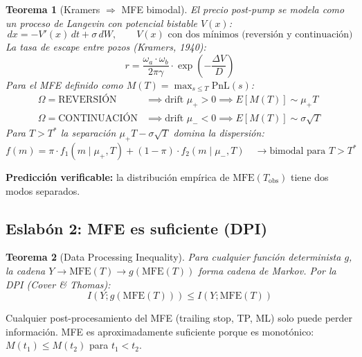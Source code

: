 \documentclass[11pt,a4paper]{article}
\newtheorem{theorem}{Teorema}
\begin{document}
\begin{theorem}[Kramers $\Rightarrow$ MFE bimodal]
El precio post-pump se modela como un proceso de Langevin con potencial bistable $V(x)$:
\begin{equation}
dx = -V'(x)\,dt + \sigma\,dW, \qquad V(x) \text{ con dos mínimos (reversión y continuación)}
\end{equation}
La tasa de escape entre pozos (Kramers, 1940):
\begin{equation}
r = \frac{\omega_a \cdot \omega_b}{2\pi\gamma} \cdot \exp\!\left(-\frac{\Delta V}{D}\right)
\end{equation}
Para el MFE definido como $M(T) = \max_{s \leq T} \text{PnL}(s)$:
\begin{align}
\Omega = \text{REVERSIÓN} &\implies \text{drift } \mu_+ > 0 \implies E[M(T)] \sim \mu_+ T \\
\Omega = \text{CONTINUACIÓN} &\implies \text{drift } \mu_- < 0 \implies E[M(T)] \sim \sigma\sqrt{T}
\end{align}
Para $T > T^*$ la separación $\mu_+ T - \sigma\sqrt{T}$ domina la dispersión:
\begin{equation}
f(m) = \pi \cdot f_1(m \mid \mu_+, T) + (1-\pi) \cdot f_2(m \mid \mu_-, T) \quad \longrightarrow \text{bimodal para } T > T^*
\end{equation}
\end{theorem}
 
\textbf{Predicción verificable:} la distribución empírica de $\text{MFE}(T_{\text{obs}})$ tiene dos modos separados.
 
\subsection{Eslabón 2: MFE es suficiente (DPI)}
 
\begin{theorem}[Data Processing Inequality]
Para cualquier función determinista $g$, la cadena $Y \to \text{MFE}(T) \to g(\text{MFE}(T))$ forma cadena de Markov. Por la DPI (Cover \& Thomas):
\begin{equation}
I(Y; g(\text{MFE}(T))) \leq I(Y; \text{MFE}(T))
\end{equation}
\end{theorem}
 
Cualquier post-procesamiento del MFE (trailing stop, TP, ML) solo puede perder información. MFE es aproximadamente suficiente porque es monotónico: $M(t_1) \leq M(t_2)$ para $t_1 < t_2$.
 
\end{document}
